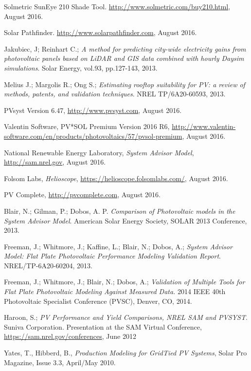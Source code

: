 \documentclass[twocolumn,10pt]{asme2ej}
\begin{document}
\begin{thebibliography}{8}

 Solmetric SunEye 210 Shade Tool. \url{http://www.solmetric.com/buy210.html}, August 2016.

 Solar Pathfinder. \url{http://www.solarpathfinder.com}, August 2016.


 Jakubiec, J; Reinhart C.; \emph{A method for predicting city-wide electricity gains from photovoltaic panels based on LiDAR and GIS data combined with hourly Daysim simulations}. Solar Energy, vol.93, pp.127-143, 2013.

  Melius J.; Margolis R.; Ong S.; \emph{Estimating rooftop suitability for PV: a review of methods, patents, and validation techniques}. NREL TP/6A20-60593, 2013.

 PVsyst Version 6.47, \url{http://www.pvsyst.com}, August 2016.

 Valentin Software, PV*SOL Premium Version 2016 R6, \url{http://www.valentin-software.com/en/products/photovoltaics/57/pvsol-premium}, August 2016.

 National Renewable Energy Laboratory, \emph{System Advisor Model}, \url{http://sam.nrel.gov}, August 2016.

 Folsom Labs, \emph{Helioscope}, \url{https://helioscope.folsomlabs.com/}, August 2016.

 PV Complete, \url{http://pvcomplete.com}, August 2016.

 Blair, N.; Gilman, P.; Dobos, A. P. \emph{Comparison of Photovoltaic models in the System Advisor Model}. American Solar Energy Society, SOLAR 2013 Conference, 2013.

 Freeman, J.; Whitmore, J.; Kaffine, L.; Blair, N.; Dobos, A.; \emph{System Advisor Model: Flat Plate Photovoltaic Performance Modeling Validation Report}. NREL/TP-6A20-60204, 2013.

 Freeman, J.; Whitmore, J.; Blair, N.; Dobos, A.; \emph{Validation of Multiple Tools for Flat Plate Photovoltaic Modeling Against Measured Data.} 2014 IEEE 40th Photovoltaic Specialist Conference (PVSC), Denver, CO, 2014.

 Haroon, S.; \emph{PV Performance and Yield Comparisons, NREL SAM and PVSYST}. Suniva Corporation. Presentation at the SAM Virtual Conference, \url{https://sam.nrel.gov/conferences}, June 2012

 Yates, T., Hibberd, B., \emph{Production Modeling for GridTied PV Systems}, Solar Pro Magazine, Issue 3.3, April/May 2010. 




\end{thebibliography}
\end{document}
